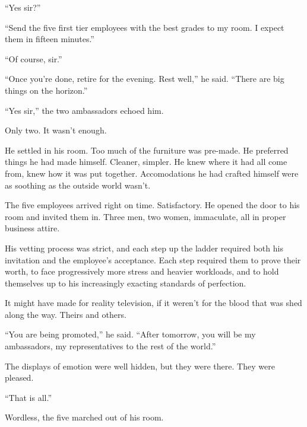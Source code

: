 ``Yes sir?''



``Send the five first tier employees with the best grades to my room.  I expect them in fifteen minutes.''



``Of course, sir.''



``Once you're done, retire for the evening.  Rest well,'' he said.  ``There are big things on the horizon.''



``Yes sir,'' the two ambassadors echoed him.



Only two.  It wasn't enough.



He settled in his room.  Too much of the furniture was pre-made.  He preferred things he had made himself.  Cleaner, simpler.  He knew where it had all come from, knew how it was put together.  Accomodations he had crafted himself were as soothing as the outside world wasn't.



The five employees arrived right on time.  Satisfactory.  He opened the door to his room and invited them in.  Three men, two women, immaculate, all in proper business attire.



His vetting process was strict, and each step up the ladder required both his invitation and the employee's acceptance.  Each step required them to prove their worth, to face progressively more stress and heavier workloads, and to hold themselves up to his increasingly exacting standards of perfection.



It might have made for reality television, if it weren't for the blood that was shed along the way.  Theirs and others.



``You are being promoted,'' he said.  ``After tomorrow, you will be my ambassadors, my representatives to the rest of the world.''



The displays of emotion were well hidden, but they were there.  They were pleased.



``That is all.''



Wordless, the five marched out of his room.



